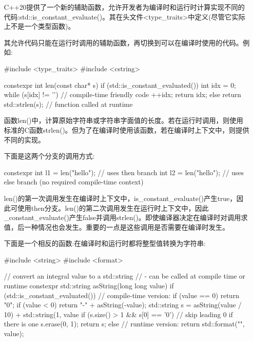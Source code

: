 
C++20提供了一个新的辅助函数，允许开发者为编译时和运行时计算实现不同的代码:std::is\_constant\_evaluate()。其在头文件<type\_traits>中定义(尽管它实际上不是一个类型函数)。

其允许代码只能在运行时调用的辅助函数，再切换到可以在编译时使用的代码。例如:


\begin{cpp}
#include <type_traits>
#include <cstring>

constexpr int len(const char* s)
{
	if (std::is_constant_evaluated()) {
		int idx = 0;
		while (s[idx] != '\0') { // compile-time friendly code
			++idx;
		}
		return idx;
	}
	else {
		return std::strlen(s); // function called at runtime
	}
}
\end{cpp}

函数len()中，计算原始字符串或字符串字面值的长度。若在运行时调用，则使用标准的C函数strlen()。但为了在编译时使用该函数，若在编译时上下文中，则提供不同的实现。

下面是这两个分支的调用方式:

\begin{cpp}
constexpr int l1 = len("hello"); // uses then branch
int l2 = len("hello"); // uses else branch (no required compile-time context)
\end{cpp}

len()的第一次调用发生在编译时上下文中，is\_constant\_evaluate()产生true，因此可使用then分支。len()的第二次调用发生在运行时上下文中，因此\_constant\_evaluate()产生false并调用strlen()。即使编译器决定在编译时对调用求值，后一种情况也会发生。重要的一点是这些调用是否需要在编译时发生。

下面是一个相反的函数:在编译时和运行时都将整型值转换为字符串:


\begin{cpp}
#include <string>
#include <format>

// convert an integral value to a std::string
// - can be called at compile time or runtime
constexpr std::string asString(long long value)
{
	if (std::is_constant_evaluated()) {
		// compile-time version:
		if (value == 0) {
			return "0";
		}
		if (value < 0) {
			return "-" + asString(-value);
		}
		std::string s = asString(value / 10) + std::string(1, value %
		if (s.size() > 1 && s[0] == '0') { // skip leading 0 if there is one
			s.erase(0, 1);
		}
		return s;
	}
	else {
		// runtime version:
		return std::format("{}", value);
	}
}
\end{cpp}

